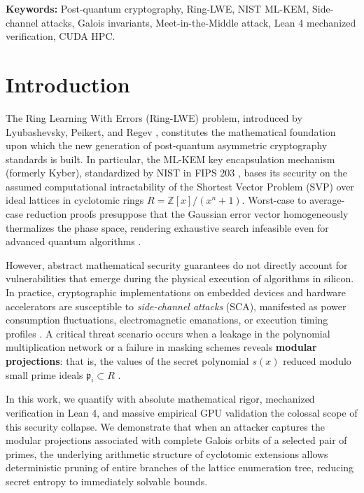 \documentclass[11pt,a4paper]{article}
\theoremstyle{plain}
\theoremstyle{definition}
\numberwithin{equation}{section}
\newcommand{\ZZ}{\mathbb{Z}}
\newcommand{\fkp}{\mathfrak{p}}
\begin{document}
\noindent\textbf{Keywords:} Post-quantum cryptography, Ring-LWE, NIST ML-KEM, Side-channel attacks, Galois invariants, Meet-in-the-Middle attack, Lean 4 mechanized verification, CUDA HPC.

\vspace{1em}

\section{Introduction}
\label{sec:intro}

The Ring Learning With Errors (Ring-LWE) problem, introduced by Lyubashevsky, Peikert, and Regev \cite{Lyubashevsky2013}, constitutes the mathematical foundation upon which the new generation of post-quantum asymmetric cryptography standards is built. In particular, the ML-KEM key encapsulation mechanism (formerly Kyber), standardized by NIST in FIPS 203 \cite{NIST2024}, bases its security on the assumed computational intractability of the Shortest Vector Problem (SVP) over ideal lattices in cyclotomic rings $R = \ZZ[x]/(x^n+1)$. Worst-case to average-case reduction proofs presuppose that the Gaussian error vector homogeneously thermalizes the phase space, rendering exhaustive search infeasible even for advanced quantum algorithms \cite{Regev2009,Peikert2009}.

However, abstract mathematical security guarantees do not directly account for vulnerabilities that emerge during the physical execution of algorithms in silicon. In practice, cryptographic implementations on embedded devices and hardware accelerators are susceptible to \emph{side-channel attacks} (SCA), manifested as power consumption fluctuations, electromagnetic emanations, or execution timing profiles \cite{Kocher1999,Mangard2007}. A critical threat scenario occurs when a leakage in the polynomial multiplication network or a failure in masking schemes reveals \textbf{modular projections}: that is, the values of the secret polynomial $s(x)$ reduced modulo small prime ideals $\fkp_i \subset R$ \cite{Ravi2020,Wenger2024}.

In this work, we quantify with absolute mathematical rigor, mechanized verification in Lean 4, and massive empirical GPU validation the colossal scope of this security collapse. We demonstrate that when an attacker captures the modular projections associated with complete Galois orbits of a selected pair of primes, the underlying arithmetic structure of cyclotomic extensions allows deterministic pruning of entire branches of the lattice enumeration tree, reducing secret entropy to immediately solvable bounds.
\end{document}
